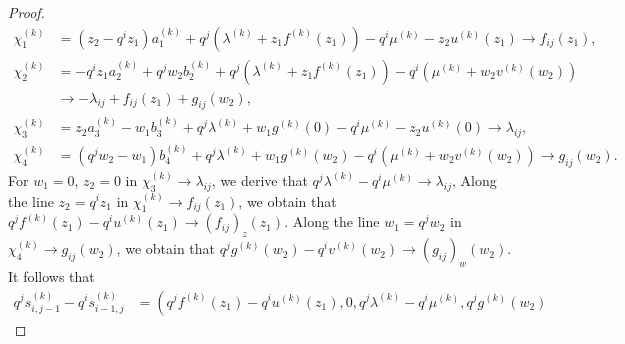 \documentclass[10pt,a4paper]{amsart}
\begin{document}
\begin{proof}
\begin{align*}
\chi_{1}^{\left(  k\right)  }  &  =\left(  z_{2}-q^{i}z_{1}\right)
a_{1}^{\left(  k\right)  }+q^{j}\left(  \lambda^{\left(  k\right)  }%
+z_{1}f^{\left(  k\right)  }\left(  z_{1}\right)  \right)  -q^{i}\mu^{\left(
k\right)  }-z_{2}u^{\left(  k\right)  }\left(  z_{1}\right)  \rightarrow
f_{ij}\left(  z_{1}\right)  ,\\
\chi_{2}^{\left(  k\right)  }  &  =-q^{i}z_{1}a_{2}^{\left(  k\right)  }%
+q^{j}w_{2}b_{2}^{\left(  k\right)  }+q^{j}\left(  \lambda^{\left(  k\right)
}+z_{1}f^{\left(  k\right)  }\left(  z_{1}\right)  \right)  -q^{i}\left(
\mu^{\left(  k\right)  }+w_{2}v^{\left(  k\right)  }\left(  w_{2}\right)
\right) \\
&  \rightarrow-\lambda_{ij}+f_{ij}\left(  z_{1}\right)  +g_{ij}\left(
w_{2}\right)  ,\\
\chi_{3}^{\left(  k\right)  }  &  =z_{2}a_{3}^{\left(  k\right)  }-w_{1}%
b_{3}^{\left(  k\right)  }+q^{j}\lambda^{\left(  k\right)  }+w_{1}g^{\left(
k\right)  }\left(  0\right)  -q^{i}\mu^{\left(  k\right)  }-z_{2}u^{\left(
k\right)  }\left(  0\right)  \rightarrow\lambda_{ij},\\
\chi_{4}^{\left(  k\right)  }  &  =\left(  q^{j}w_{2}-w_{1}\right)
b_{4}^{\left(  k\right)  }+q^{j}\lambda^{\left(  k\right)  }+w_{1}g^{\left(
k\right)  }\left(  w_{2}\right)  -q^{i}\left(  \mu^{\left(  k\right)  }%
+w_{2}v^{\left(  k\right)  }\left(  w_{2}\right)  \right)  \rightarrow
g_{ij}\left(  w_{2}\right)  .
\end{align*}
For $w_{1}=0$, $z_{2}=0$ in $\chi_{3}^{\left(  k\right)  }\rightarrow
\lambda_{ij}$, we derive that $q^{j}\lambda^{\left(  k\right)  }-q^{i}%
\mu^{\left(  k\right)  }\rightarrow\lambda_{ij}$, Along the line $z_{2}%
=q^{i}z_{1}$ in $\chi_{1}^{\left(  k\right)  }\rightarrow f_{ij}\left(
z_{1}\right)  $, we obtain that $q^{j}f^{\left(  k\right)  }\left(
z_{1}\right)  -q^{i}u^{\left(  k\right)  }\left(  z_{1}\right)  \rightarrow
\left(  f_{ij}\right)  _{z}\left(  z_{1}\right)  $. Along the line
$w_{1}=q^{j}w_{2}$ in $\chi_{4}^{\left(  k\right)  }\rightarrow g_{ij}\left(
w_{2}\right)  $, we obtain that $q^{j}g^{\left(  k\right)  }\left(
w_{2}\right)  -q^{i}v^{\left(  k\right)  }\left(  w_{2}\right)  \rightarrow
\left(  g_{ij}\right)  _{w}\left(  w_{2}\right)  $. It follows that
\begin{align*}
q^{j}s_{i,j-1}^{\left(  k\right)  }-q^{i}s_{i-1,j}^{\left(  k\right)  }  &
=\left(  q^{j}f^{\left(  k\right)  }\left(  z_{1}\right)  -q^{i}u^{\left(
k\right)  }\left(  z_{1}\right)  ,0,q^{j}\lambda^{\left(  k\right)  }-q^{i}%
\mu^{\left(  k\right)  },q^{j}g^{\left(  k\right)  }\left(  w_{2}\right)

\end{align*}
\end{proof}
\end{document}
